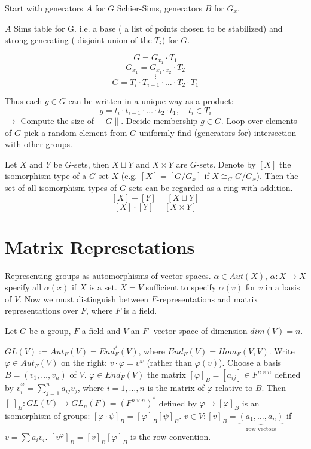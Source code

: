\documentclass[12pt]{amsart}
\theoremstyle{definition}
\begin{document}
Start with generators $A$ for $G$ Schier-Sims, generators $B$ for $G_{x}$.

$A$ Sims table for G. i.e. a base ( a list of points chosen to be stabilized) and strong generating ( disjoint union of the $T_{i}$) for $G$.

$$G = G_{x_{1}} \cdot T_{1}$$
$$G_{x_{1}} = G_{x_{1} \cdot x_{2}} \cdot T_{2}$$
$$ \vdots$$
$$G = T_{i} \cdot T_{i - 1} \cdot \ldots \cdot T_{2} \cdot T_{1}$$

Thus each $g \in G$ can be written in a unique way as a product:
$$g = t_{i} \cdot t_{i - 1} \cdot \ldots \cdot t_{2} \cdot t_{1}, \quad t_{i} \in T_{i}$$
 $\rightarrow$ Compute the size of $\| G \|$. Decide membership $g \in G$. Loop over elements of $G$ pick a random element from $G$ uniformly find (generators for) intersection with other groups.

Let $X$ and $Y$ be $G$-sets, then $X \sqcup Y$ and $X \times Y$ are $G$-sets. Denote by $[X]$ the isomorphism type of a $G$-set $X$ (e.g. $[X] = [G/G_{x}]$ if $X \cong_{G} G/G_{x}$). Then the set of all isomorphism types of $G$-sets can be regarded as a ring with addition. $$[X] + [Y] = [X \sqcup Y]$$ $$[X] \cdot [Y] = [ X \times Y]$$

\section{Matrix Represetations}

Representing groups as automorphisms of vector spaces. $\alpha \in Aut(X)$, $\alpha: X \rightarrow X$ specify all $\alpha (x)$ if $X$ is a set. $X = V$ sufficient to specify $\alpha (v)$ for $v$ in a basis of $V$. Now we must distinguish between $F$-representations and matrix representations over $F$, where $F$ is a field. 

Let $G$ be a group, $F$ a field and $V$ an $F$- vector space of dimension $dim(V) = n$. 

$GL(V) := Aut_{F} (V) = End_{F}^{\ast} (V)$, where $End_{F} (V) = Hom_{F} (V, V)$. Write $\varphi \in Aut_{F} (V)$ on the right: $v \cdot \varphi = v^{\varphi}$ (rather than $\varphi (v)$). Choose a basis $B = \left( v_{1}, \ldots, v_{n} \right)$ of $V$. $\varphi \in End_{F} (V)$ the matrix $[ \varphi ]_{B} = [ a_{i j} ] \in F^{n \times n}$ defined by $v_{i}^{\varphi}  = \sum_{j = 1}^{n} {a_{ij}}{v_{j}}$, where $i = 1, \ldots, n$ is the matrix of $\varphi$ relative to $B$. Then $[ \  ]_{B} : GL(V) \rightarrow GL_{n} (F) = \left( F^{n \times n} \right)^{\ast}$ defined by $\varphi \mapsto [ \varphi ]_{B}$ is an isomorphism of groups: $[ \varphi \cdot \psi ]_{B} = [ \varphi ]_{B} [ \psi ]_{B}$. $v \in V: [ v ]_{B} = \underbrace{\left( a_{1}, \ldots, a_{n} \right)}_{\text{row vectors}}$ if $v = \sum{a_{i}}{v_{i}}$. $\left[ v^{\varphi} \right]_{B} = [v]_{B} [ \varphi ]_{B}$ is the row convention. 
\end{document}
